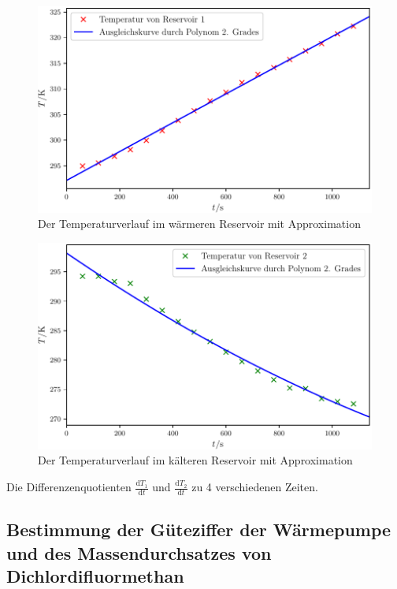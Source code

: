 \begin{figure}
	\centering
	\includegraphics[scale = 1,keepaspectratio]
	{content/images/T1.pdf}
	\caption{Der Temperaturverlauf im wärmeren Reservoir mit Approximation }
	\label{fig:Temp1}
\end{figure}
\begin{figure}
	\centering
	\includegraphics[scale = 1,keepaspectratio]
	{content/images/T2.pdf}
	\caption{Der Temperaturverlauf im kälteren Reservoir mit Approximation }
	\label{fig:Temp2}
\end{figure}
\begin{table}
  	\centering
  	\caption{Die Differenzenquotienten $\frac{\text{d}T_1}{\text{d}t}$ und $\frac{\text{d}T_2}{\text{d}t}$ zu 4 verschiedenen Zeiten.}
  	\label{tab:Ableitungen}
\end{table}

\subsection{Bestimmung der Güteziffer der Wärmepumpe und des Massendurchsatzes von Dichlordifluormethan }

